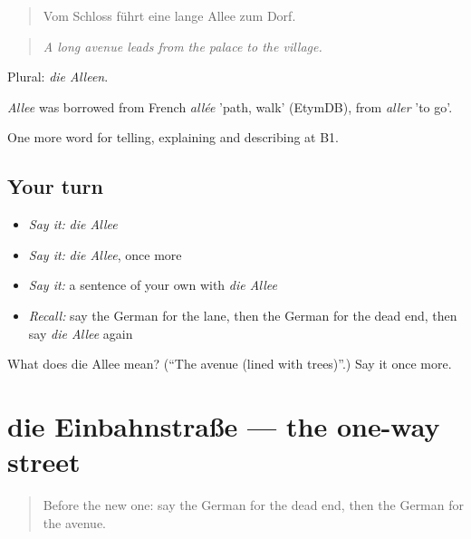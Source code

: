 \begin{quote}
Vom Schloss führt eine lange Allee zum Dorf.
\end{quote}

\begin{quote}
\emph{A long avenue leads from the palace to the village.}
\end{quote}

Plural: \emph{die Alleen}.

\begin{cousinweb}
\emph{Allee} was borrowed from French \emph{allée} 'path, walk' (EtymDB), from \emph{aller} 'to go'.
\end{cousinweb}

\begin{grammarlens}[title={What you've built}]
One more word for telling, explaining and describing at B1.
\end{grammarlens}

\subsection*{Your turn}
\begin{itemize}
\raggedright
  \item \emph{Say it:} \emph{die Allee}
  \item \emph{Say it:} \emph{die Allee}, once more
  \item \emph{Say it:} a sentence of your own with \emph{die Allee}
  \item \emph{Recall:} say the German for the lane, then the German for the dead end, then say \emph{die Allee} again
\end{itemize}

\begin{tcolorbox}[breakable,colback=teal!4,colframe=teal!35!black,title={Before you move on}]
What does die Allee mean? (\textquotedblleft{}The avenue (lined with trees)\textquotedblright{}.) Say it once more.
\end{tcolorbox}
\section[die Einbahnstraße]{die Einbahnstraße — the one-way street}

\label{lesson:GE-C436-einbahnstrasse}



\begin{quote}
Before the new one: say the German for the dead end, then the German for the avenue.
\end{quote}

